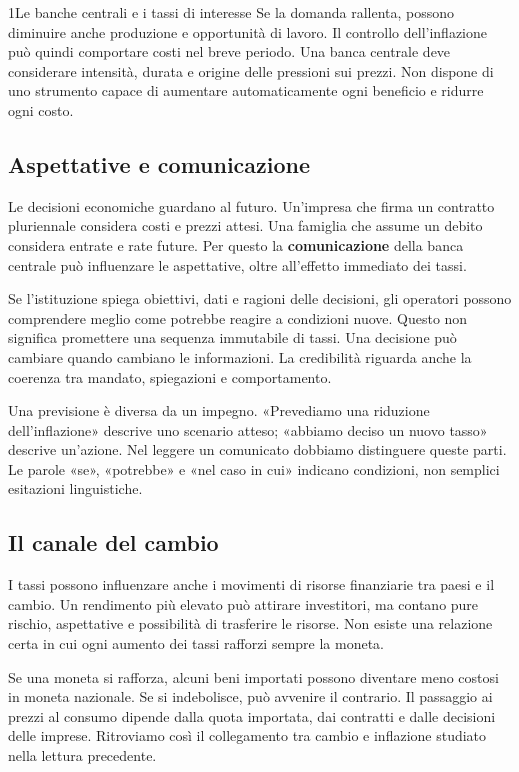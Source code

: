 \begin{lettura}{1}{Le banche centrali e i tassi di interesse}
Se la domanda rallenta, possono diminuire anche produzione e opportunità di lavoro. Il controllo dell'inflazione può quindi comportare costi nel breve periodo. Una banca centrale deve considerare intensità, durata e origine delle pressioni sui prezzi. Non dispone di uno strumento capace di aumentare automaticamente ogni beneficio e ridurre ogni costo.

\subsection*{Aspettative e comunicazione}
Le decisioni economiche guardano al futuro. Un'impresa che firma un contratto pluriennale considera costi e prezzi attesi. Una famiglia che assume un debito considera entrate e rate future. Per questo la \textbf{comunicazione} della banca centrale può influenzare le aspettative, oltre all'effetto immediato dei tassi.

Se l'istituzione spiega obiettivi, dati e ragioni delle decisioni, gli operatori possono comprendere meglio come potrebbe reagire a condizioni nuove. Questo non significa promettere una sequenza immutabile di tassi. Una decisione può cambiare quando cambiano le informazioni. La credibilità riguarda anche la coerenza tra mandato, spiegazioni e comportamento.

Una previsione è diversa da un impegno. «Prevediamo una riduzione dell'inflazione» descrive uno scenario atteso; «abbiamo deciso un nuovo tasso» descrive un'azione. Nel leggere un comunicato dobbiamo distinguere queste parti. Le parole «se», «potrebbe» e «nel caso in cui» indicano condizioni, non semplici esitazioni linguistiche.

\subsection*{Il canale del cambio}
I tassi possono influenzare anche i movimenti di risorse finanziarie tra paesi e il cambio. Un rendimento più elevato può attirare investitori, ma contano pure rischio, aspettative e possibilità di trasferire le risorse. Non esiste una relazione certa in cui ogni aumento dei tassi rafforzi sempre la moneta.

Se una moneta si rafforza, alcuni beni importati possono diventare meno costosi in moneta nazionale. Se si indebolisce, può avvenire il contrario. Il passaggio ai prezzi al consumo dipende dalla quota importata, dai contratti e dalle decisioni delle imprese. Ritroviamo così il collegamento tra cambio e inflazione studiato nella lettura precedente.


\end{lettura}
